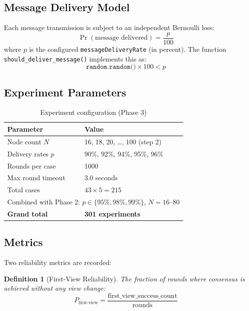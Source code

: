 \documentclass[12pt,a4paper]{article}
\newtheorem{definition}{Definition}
\begin{document}
\subsection{Message Delivery Model}

Each message transmission is subject to an independent Bernoulli loss:
\begin{equation}
  \Pr(\text{message delivered}) = \frac{p}{100}
\end{equation}
where $p$ is the configured \texttt{messageDeliveryRate} (in percent). The function \texttt{should\_deliver\_message()} implements this as:
\[
  \texttt{random.random()} \times 100 < p
\]

\subsection{Experiment Parameters}

\begin{table}[H]
\centering
\caption{Experiment configuration (Phase 3)}
\begin{tabular}{ll}
\toprule
\textbf{Parameter} & \textbf{Value} \\
\midrule
Node count $N$ & 16, 18, 20, \ldots, 100 (step 2) \\
Delivery rates $p$ & 90\%, 92\%, 94\%, 95\%, 96\% \\
Rounds per case & 1000 \\
Max round timeout & 3.0 seconds \\
Total cases & $43 \times 5 = 215$ \\
\midrule
\multicolumn{2}{l}{Combined with Phase 2: $p \in \{95\%, 98\%, 99\%\}$, $N = 16$--$80$} \\
\textbf{Grand total} & \textbf{301 experiments} \\
\bottomrule
\end{tabular}
\end{table}

\subsection{Metrics}

Two reliability metrics are recorded:

\begin{definition}[First-View Reliability]
The fraction of rounds where consensus is achieved without any view change:
\[
  P_{\text{first-view}} = \frac{\text{first\_view\_success\_count}}{\text{rounds}}
\]
\end{definition}
\end{document}

